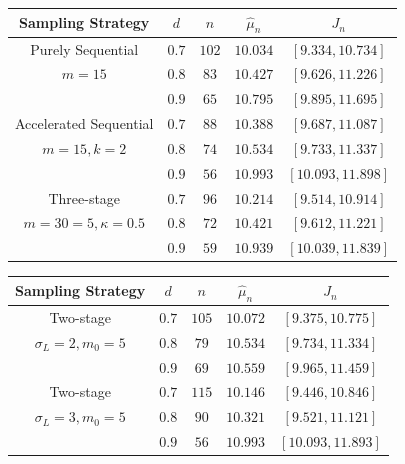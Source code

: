 \documentclass [xcolor=svgnames, t] {beamer}
\begin{document}
\begin{frame}{}
    \vspace{8mm}
    \begin{center}
\begin{tabular}{c c c c c} 
 \hline
 Sampling Strategy & $d$ & $n$ & $\hat{\mu}_n$ & $J_n$  \\  
 \hline
{Purely Sequential}  & $0.7$ & $102$ & $10.034$ & $[9.334,10.734]$  \\ 
 $m=15$ & $0.8$ & $83$ & $10.427$ & $[9.626,11.226]$ \\
  & $0.9$ & $65$ & $10.795$ & $[9.895,11.695]$\\
 \hline
 {Accelerated Sequential}  & $0.7$ & $88$ & $10.388$ & $[9.687,11.087]$  \\ 
 $m=15, k=2$ & $0.8$ & $74$ & $10.534$ & $[9.733,11.337]$ \\
  & $0.9$ & $56$ & $10.993$ & $[10.093,11.898]$\\
  \hline
{Three-stage }  & $0.7$ & $96$ &$10.214$ & $[9.514,10.914]$  \\ 
 $m=30=5,\kappa=0.5$ & $0.8$ & $72$ & $10.421$ & $[9.612,11.221]$ \\
  & $0.9$ & $59$ & $10.939$ & $[10.039,11.839]$\\
 \hline
\end{tabular}
\end{center}
\end{frame}
\begin{frame}{}
    \vspace{8mm}
    \begin{center}
\begin{tabular}{c c c c c} 
 \hline
 Sampling Strategy & $d$ & $n$ & $\hat{\mu}_n$ & $J_n$  \\  
  \hline
{Two-stage }  & $0.7$ & $105$ &$10.072$ & $[9.375,10.775]$  \\ 
 $\sigma_L=2,m_0=5$ & $0.8$ & $79$ & $10.534$ & $[9.734,11.334]$ \\
  & $0.9$ & $69$ & $10.559$ & $[9.965,11.459]$\\
 \hline
{Two-stage }  & $0.7$ & $115$ & $10.146$ & $[9.446,10.846]$  \\ 
 $\sigma_L=3,m_0=5$ & $0.8$ & $90$ & $10.321$ & $[9.521,11.121]$ \\
  & $0.9$ & $56$ & $10.993$ & $[10.093,11.893]$\\
 \hline
\end{tabular}
\end{center}
\end{frame}
\end{document}
